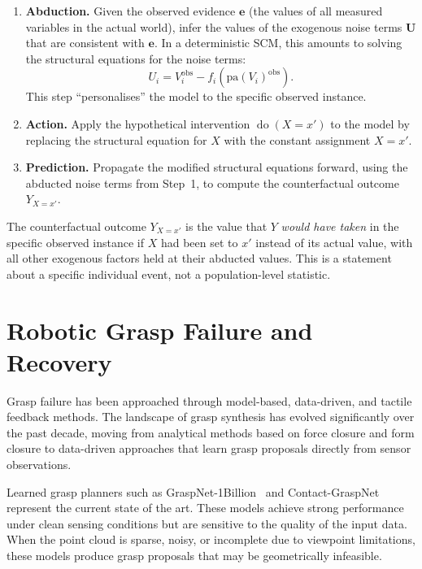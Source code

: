 \documentclass[11pt,a4paper]{report}
\newcommand{\doop}{\operatorname{do}}
\begin{document}
\begin{enumerate}
  \item \textbf{Abduction.} Given the observed evidence $\mathbf{e}$ (the values of all measured variables in the actual world), infer the values of the exogenous noise terms $\mathbf{U}$ that are consistent with $\mathbf{e}$. In a deterministic SCM, this amounts to solving the structural equations for the noise terms:
  \begin{equation}
    U_i = V_i^{\text{obs}} - f_i(\text{pa}(V_i)^{\text{obs}}).
    \label{eq:abduction}
  \end{equation}
  This step ``personalises'' the model to the specific observed instance.

  \item \textbf{Action.} Apply the hypothetical intervention $\doop(X = x')$ to the model by replacing the structural equation for $X$ with the constant assignment $X = x'$.

  \item \textbf{Prediction.} Propagate the modified structural equations forward, using the abducted noise terms from Step~1, to compute the counterfactual outcome $Y_{X=x'}$.
\end{enumerate}

The counterfactual outcome $Y_{X=x'}$ is the value that $Y$ \emph{would have taken} in the specific observed instance if $X$ had been set to $x'$ instead of its actual value, with all other exogenous factors held at their abducted values. This is a statement about a specific individual event, not a population-level statistic.

\section{Robotic Grasp Failure and Recovery}
\label{sec:bg_grasp}

Grasp failure has been approached through model-based, data-driven, and tactile feedback methods. The landscape of grasp synthesis has evolved significantly over the past decade, moving from analytical methods based on force closure and form closure to data-driven approaches that learn grasp proposals directly from sensor observations.

Learned grasp planners such as GraspNet-1Billion~\cite{fang2020graspnet} and Contact-GraspNet~\cite{sundermeyer2021contact} represent the current state of the art. These models achieve strong performance under clean sensing conditions but are sensitive to the quality of the input data. When the point cloud is sparse, noisy, or incomplete due to viewpoint limitations, these models produce grasp proposals that may be geometrically infeasible.
\end{document}
